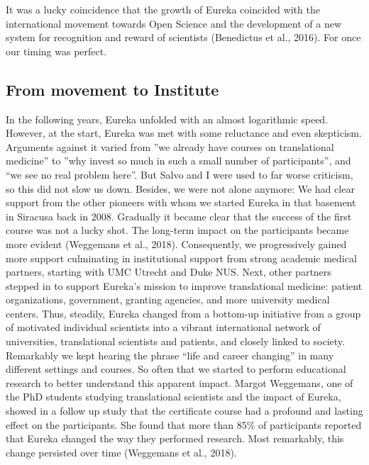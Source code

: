\documentclass[authordate, editorial]{jote-new-article}
\begin{document}
	It was a lucky coincidence that the growth of Eureka coincided with the international movement towards Open Science and the development of a new system for recognition and reward of scientists (Benedictus et al., 2016). For once our timing was perfect.







	\subsection{From movement to Institute}



	In the following years, Eureka unfolded with an almost logarithmic speed. However, at the start, Eureka was met with some reluctance and even skepticism. Arguments against it varied from ”we already have courses on translational medicine” to ”why invest so much in such a small number of participants”, and “we see no real problem here”. But Salvo and I were used to far worse criticism, so this did not slow us down. Besides, we were not alone anymore: We had clear support from the other pioneers with whom we started Eureka in that basement in Siracusa back in 2008. Gradually it became clear that the success of the first course was not a lucky shot. The long-term impact on the participants became more evident (Weggemans et al., 2018). Consequently, we progressively gained more support culminating in institutional support from strong academic medical partners, starting with UMC Utrecht and Duke NUS. Next, other partners stepped in to support Eureka's mission to improve translational medicine: patient organizations, government, granting agencies, and more university medical centers. Thus, steadily, Eureka changed from a bottom-up initiative from a group of motivated individual scientists into a vibrant international network of universities, translational scientists and patients, and closely linked to society. Remarkably we kept hearing the phrase “life and career changing” in many different settings and courses. So often that we started to perform educational research to better understand this apparent impact. Margot Weggemans, one of the PhD students studying translational scientists and the impact of Eureka, showed in a follow up study that the certificate course had a profound and lasting effect on the participants. She found that more than 85\% of participants reported that Eureka changed the way they performed research. Most remarkably, this change persisted over time (Weggemans et al., 2018).
\end{document}
